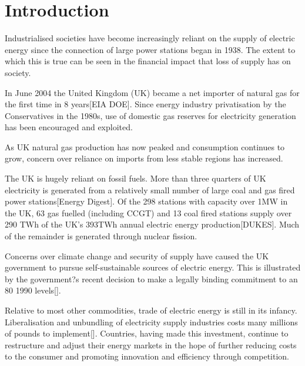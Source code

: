 \section{Introduction}
Industrialised societies have become increasingly reliant on the supply of
electric energy since the connection of large power stations began in 1938.
The extent to which this is true can be seen in the financial impact that loss
of supply has on society.


In June 2004 the United Kingdom (UK) became a net importer of natural gas for
the first time in 8 years[EIA DOE].  Since energy industry privatisation by
the Conservatives in the 1980s, use of domestic gas reserves for electricity
generation has been encouraged and exploited.


As UK natural gas production has now peaked and consumption continues to grow,
concern over reliance on imports from less stable regions has increased.

The UK is hugely reliant on fossil fuels.  More than three quarters of UK
electricity is generated from a relatively small number of large coal and gas
fired power stations[Energy Digest].  Of the 298 stations with capacity over
1MW in the UK, 63 gas fuelled (including CCGT) and 13 coal fired stations
supply over 290 TWh of the UK's 393TWh annual electric energy
production[DUKES].  Much of the remainder is generated through nuclear
fission.


Concerns over climate change and security of supply have caused the UK
government to pursue self-sustainable sources of electric energy.  This is
illustrated by the government?s recent decision to make a legally binding
commitment to an 80%
1990 levels[].


Relative to most other commodities, trade of electric energy is still in its
infancy.  Liberalisation and unbundling of electricity supply industries costs
many millions of pounds to implement[].  Countries, having made this
investment, continue to restructure and adjust their energy markets in the
hope of further reducing costs to the consumer and promoting innovation and
efficiency through competition.


